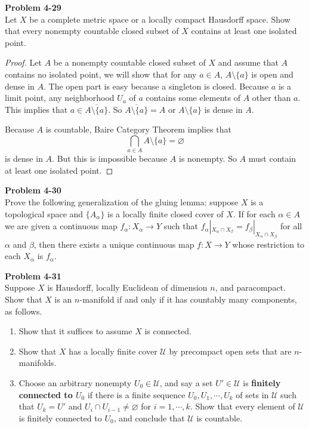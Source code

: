 \documentclass[12pt, a4paper]{article}
\theoremstyle{plain}
\newcommand{\U}{\mathscr{U}}
\newenvironment{problem}[2][Problem]
    { \begin{mdframed}[backgroundcolor=gray!20] \textbf{#1 #2} \\}
    {  \end{mdframed}}
\begin{document}
\begin{problem}{4-29}
    Let $X$ be a complete metric space or a locally compact Hausdorff space. Show that every nonempty countable closed subset of $X$ contains at least one isolated point.
\end{problem}
    \begin{proof}
        Let $A$ be a nonempty countable closed subset of $X$ and assume that $A$ contains no isolated point, we will show that for any $a\in A$, $A\setminus\{a\}$ is open and dense in $A$. The open part is easy because a singleton is closed. Because $a$ is a limit point, any neighborhood $U_a$ of $a$ contains some elements of $A$ other than $a$. This implies that $a\in \overline{A\setminus\{a\}}$. So $\overline{A\setminus\{a\}}=A$ or $A\setminus\{a\}$ is dense in $A$. 

        Because $A$ is countable, Baire Category Theorem implies that 
        \[
        \bigcap_{a\in A}A\setminus \{a\} = \varnothing
        \]
        is dense in $A$. But this is impossible because $A$ is nonempty. So $A$ must contain at least one isolated point.
    \end{proof}

\begin{problem}{4-30}
    Prove the following generalization of the gluing lemma: suppose $X$ is a topological space and $\{A_\alpha\}$ is a locally finite closed cover of $X$. If for each $\alpha\in A$ we are given a continuous map $f_\alpha\colon X_\alpha\to Y$ such that $f_\alpha|_{X_\alpha\cap X_\beta}=f_\beta|_{X_\alpha\cap X_\beta}$ for all $\alpha$ and $\beta$, then there exists a unique continuous map $f\colon X\to Y$ whose restriction to each $X_\alpha$ is $f_\alpha$.  
\end{problem}

\begin{problem}{4-31}
    Suppose $X$ is Hausdorff, locally Euclidean of dimension $n$, and paracompact. Show that $X$ is an $n$-manifold if and only if it has countably many components, as follows.
    \begin{enumerate}[label=(\roman)]
        \item Show that it suffices to assume $X$ is connected.
        \item Show that $X$ has a locally finite cover $\U$ by precompact open sets that are $n$-manifolds.
        \item Choose an arbitrary nonempty $U_0\in \U$, and say a set $U'\in \U$ is \textbf{finitely connected to $U_0$} if there is a finite sequence $U_0,U_1,\cdots,U_k$ of sets in $\U$ such that $U_k=U'$ and $U_i\cap U_{i-1}\neq \varnothing$ for $i=1,\cdots,k$. Show that every element of $\U$ is finitely connected to $U_0$, and conclude that $\U$ is countable.
    \end{enumerate}
\end{problem}
\end{document}
